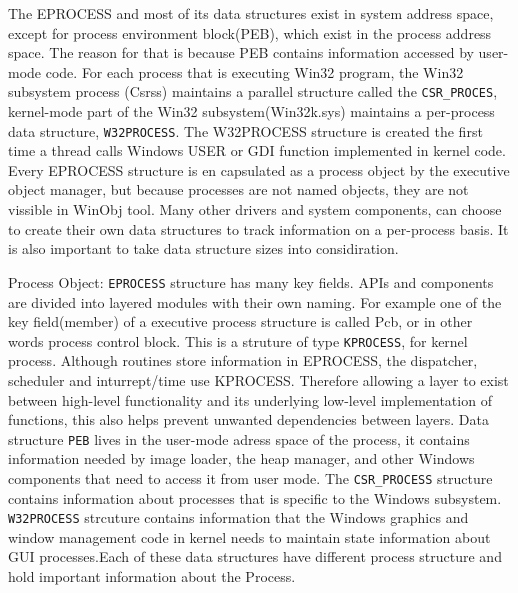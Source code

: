 \documentclass[letterpaper,10pt,draftclsnofoot,onecolumn]{IEEEtran}
\begin{document}
The EPROCESS and most of its data structures exist in system address space, except for process environment block(PEB), which exist in the process address space. The reason for that is because PEB contains information accessed by user-mode code. For each process that is executing Win32 program, the Win32 subsystem process (Csrss) maintains a parallel structure called the \verb|CSR_PROCES|, kernel-mode part of the Win32 subsystem(Win32k.sys) maintains a per-process data structure, \verb|W32PROCESS|. The W32PROCESS structure is created the first time a thread calls Windows USER or GDI function implemented in kernel code. Every EPROCESS structure is en capsulated as a process object by the executive object manager, but because processes are not named objects, they are not vissible in WinObj tool. Many other drivers and system components, can choose to create their own data structures to track information on a per-process basis. It is also important to take data structure sizes into considiration.\cite{[1]}

Process Object: \verb|EPROCESS| structure has many key fields. APIs and components are divided into layered modules with their own naming. For example one of the key field(member) of a executive process structure is called Pcb, or in other words process control block. This is a struture of type \verb|KPROCESS|, for kernel process. Although routines store information in EPROCESS, the dispatcher, scheduler and inturrept/time use KPROCESS. Therefore allowing a layer to exist between high-level functionality and its underlying low-level implementation of functions, this also helps prevent unwanted dependencies between layers. Data structure \verb|PEB| lives in the user-mode adress space of the process, it contains information needed by image loader, the heap manager, and other Windows components that need to access it from user mode. The \verb|CSR_PROCESS| structure contains information about processes that is specific to the Windows subsystem. \verb|W32PROCESS| strcuture contains information that the Windows graphics and window management code in kernel needs to maintain state information about GUI processes.Each of these data structures have different process structure and hold important information about the Process.
\end{document}
